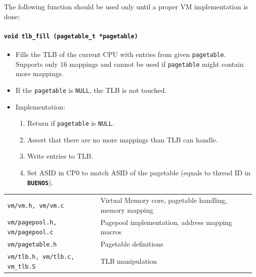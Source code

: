 \documentclass[twoside,a4paper]{report}
\makeatletter
\newcommand{\PBS}[1]{\let\temp=\\#1\let\\=\temp}
\newlength{\tablewidth}
\newenvironment{function}[3]{%
\paragraph{\texttt{#1 {\textbf{#2}} (#3)}}%
\index{#2@\texttt{#2}}%
\begin{itemize}%
}{%
\end{itemize}%
}
\newcommand{\buenos}{\texttt{\textbf{BUENOS}}}
\newenvironment{filelist}[0]{%
\vspace{\baselineskip}%
\begin{center}%
\begin{tabular}{p{4cm}>{\PBS\raggedright}p{\tablewidth-4\tabcolsep-4cm}}%
\hline%
}{%
\end{tabular}%
\end{center}%
}
\newcommand{\file}[2]{\texttt{#1} \vspace{2mm} & #2 \vspace{2mm}\\}
\makeatother
\begin{document}
The following function should be used only until a proper VM
implementation is done:


\begin{function}{void}{tlb\_fill}{pagetable\_t *pagetable}

\item Fills the TLB of the current CPU with entries from given
\texttt{pagetable}. Supports only 16 mappings and cannot be used if
\texttt{pagetable} might contain more mappings.

\item If the \texttt{pagetable} is \texttt{NULL}, the TLB is not touched.

\item Implementation:
\begin{enumerate}

\item Return if \texttt{pagetable} is \texttt{NULL}.

\item Assert that there are no more mappings than TLB can handle.

\item Write entries to TLB.

\item Set ASID in CP0 to match ASID of the pagetable (equals to thread
ID in \buenos{}).

\end{enumerate}
\end{function}


\begin{filelist}
\file{vm/vm.h, vm/vm.c}{Virtual Memory core, pagetable handling,
memory mapping}

\file{vm/pagepool.h, vm/pagepool.c}{Pagepool implementation, address
mapping macros}

\file{vm/pagetable.h}{Pagetable definitions}

\file{vm/tlb.h, vm/tlb.c, vm\_tlb.S}{TLB manipulation}

\end{filelist}
\end{document}
